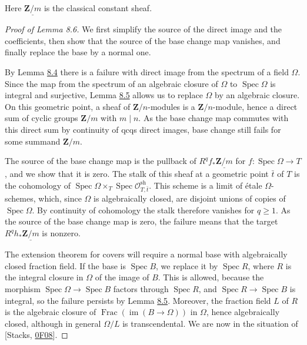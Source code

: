 \documentclass[11pt]{article}
\begin{document}
\label{bp663}%
Here \(\underline{\mathbf Z/m}\) is the classical constant sheaf.

\begin{proof}[{Proof of Lemma 8.6}]\label{bp664}%
We first simplify the source of the direct image and the coefficients, then show that the source of the base change map vanishes, and finally replace the base by a normal one.

By Lemma \hyperref[bp656]{8.4} there is a failure with direct image from the spectrum of a field \(\Omega\). Since the map from the spectrum of an algebraic closure of \(\Omega\) to \(\operatorname{Spec}\Omega\) is integral and surjective, Lemma \hyperref[bp659]{8.5} allows us to replace \(\Omega\) by an algebraic closure. On this geometric point, a sheaf of \(\mathbf Z/n\)-modules is a \(\mathbf Z/n\)-module, hence a direct sum of cyclic groups \(\mathbf Z/m\) with \(m\mid n\). As the base change map commutes with this direct sum by continuity of qcqs direct images, base change still fails for some summand \(\mathbf Z/m\).

The source of the base change map is the pullback of \(R^qf_*\underline{\mathbf Z/m}\) for \(f:\operatorname{Spec}\Omega\to T\), and we show that it is zero. The stalk of this sheaf at a geometric point \(\bar t\) of \(T\) is the cohomology of \(\operatorname{Spec}\Omega\times_T\operatorname{Spec}\mathcal O^{\mathrm{sh}}_{T,\bar t}\). This scheme is a limit of étale \(\Omega\)-schemes, which, since \(\Omega\) is algebraically closed, are disjoint unions of copies of \(\operatorname{Spec}\Omega\). By continuity of cohomology the stalk therefore vanishes for \(q\geq1\). As the source of the base change map is zero, the failure means that the target \(R^qh_*\underline{\mathbf Z/m}\) is nonzero.

The extension theorem for covers will require a normal base with algebraically closed fraction field. If the base is \(\operatorname{Spec}B\), we replace it by \(\operatorname{Spec}R\), where \(R\) is the integral closure in \(\Omega\) of the image of \(B\). This is allowed, because the morphism \(\operatorname{Spec}\Omega\to\operatorname{Spec}B\) factors through \(\operatorname{Spec}R\), and \(\operatorname{Spec}R\to\operatorname{Spec}B\) is integral, so the failure persists by Lemma \hyperref[bp659]{8.5}. Moreover, the fraction field \(L\) of \(R\) is the algebraic closure of \(\operatorname{Frac}(\operatorname{im}(B\to \Omega))\) in \(\Omega\), hence algebraically closed, although in general \(\Omega/L\) is transcendental. We are now in the situation of [Stacks, \href{https://stacks.math.columbia.edu/tag/0F08}{0F08}].
\end{proof}
\end{document}
